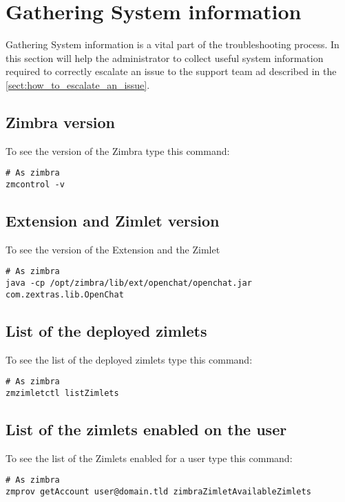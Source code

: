 \section{Gathering System information}
\label{sect:gatheringinfo}

Gathering System information is a vital part of the troubleshooting process. In this section will help the administrator
to collect useful system information required to correctly escalate an issue to the support team ad described in the
\autoref{sect:how_to_escalate_an_issue}.

    \subsection{Zimbra version}
    \label{sect:gatheringinfo-zversion}
        To see the version of the Zimbra type this command:
        \begin{verbatim}
# As zimbra
zmcontrol -v
        \end{verbatim}

    \subsection{Extension and Zimlet version}
    \label{sect:gatheringinfo-extension}
        To see the version of the Extension and the Zimlet
        \begin{verbatim}
# As zimbra
java -cp /opt/zimbra/lib/ext/openchat/openchat.jar com.zextras.lib.OpenChat
        \end{verbatim}

    \subsection{List of the deployed zimlets}
    \label{sect:gatheringinfo-listzimlets}
        To see the list of the deployed zimlets type this command:
        \begin{verbatim}
# As zimbra
zmzimletctl listZimlets
        \end{verbatim}

    \subsection{List of the zimlets enabled on the user}
    \label{sect:gatheringinfo-userzimlets}
        To see the list of the Zimlets enabled for a user type this command:
        \begin{verbatim}
# As zimbra
zmprov getAccount user@domain.tld zimbraZimletAvailableZimlets
        \end{verbatim}

